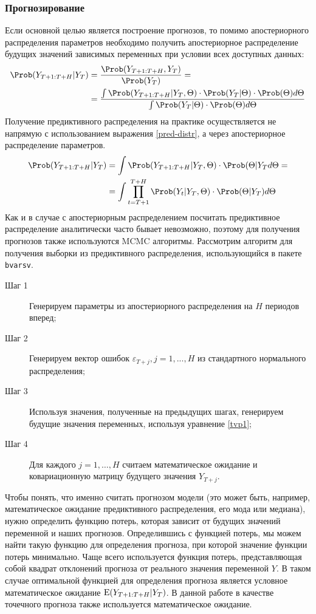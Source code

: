 \subsubsection{Прогнозирование}
Если основной целью является построение прогнозов, то помимо апостериорного распределения параметров необходимо получить апостериорное распределение будущих значений зависимых переменных при условии всех доступных данных:
\begin{align}\label{pred-distr}
\Prob (Y_{T+1:T+H}|Y_T) &= \frac{\Prob(Y_{T+1:T+H},Y_T)}{\Prob(Y_T)} = \\
 &= \frac{\int \Prob(Y_{T+1:T+H}|Y_T, \Theta)\cdot\Prob(Y_T|\Theta)\cdot\Prob(\Theta)d\Theta}{\int \Prob(Y_T|\Theta)\cdot\Prob(\Theta)d\Theta} \nonumber
\end{align}
Получение предиктивного распределения на практике осуществляется не напрямую с использованием выражения  \eqref{pred-distr},  а через апостериорное распределение параметров.\\
\begin{align*}
\Prob (Y_{T+1:T+H}|Y_T) &= \int \Prob(Y_{T+1:T+H}|Y_T, \Theta)\cdot \Prob(\Theta|Y_T d\Theta =\\
&=\int \prod_{t = T+1}^{T+H}\Prob(Y_{t}|Y_T, \Theta)\cdot \Prob(\Theta|Y_T) d\Theta
\end{align*}
Как и в случае с апостериорным распределением посчитать предиктивное распределение аналитически часто бывает невозможно, поэтому для получения прогнозов также используются MCMC алгоритмы. Рассмотрим алгоритм для получения выборки из предиктивного распределения, использующийся в пакете \texttt{bvarsv}.

\begin{description}
\item[Шаг 1] Генерируем параметры из апостериорного распределения на $H$ периодов вперед;
\item[Шаг 2] Генерируем вектор ошибок $\varepsilon_{T+j}, j = 1,...,H$ из стандартного нормального распределения;
\item[Шаг 3] Используя значения, полученные на предыдущих шагах, генерируем будущие значения переменных, используя уравнение \eqref{tvp1};
\item[Шаг 4] Для каждого $j = 1,…,H$ считаем математическое ожидание и ковариационную матрицу будущего значения $Y_{T+j}$.
\end{description}

Чтобы понять, что именно считать прогнозом модели (это может быть, например, математическое ожидание предиктивного распределения, его мода или медиана), нужно определить функцию потерь, которая зависит от будущих значений переменной и наших прогнозов. Определившись с функцией потерь, мы можем найти такую функцию для определения прогноза, при которой значение функции потерь минимально. Чаще всего используется функция потерь, представляющая собой квадрат отклонений прогноза от реального значения переменной $Y$. В таком случае оптимальной функцией для определения прогноза является условное математическое ожидание ${\rm E} (Y_{T+1:T+H}|Y_T)$. В данной работе в качестве точечного прогноза также используется математическое ожидание.
